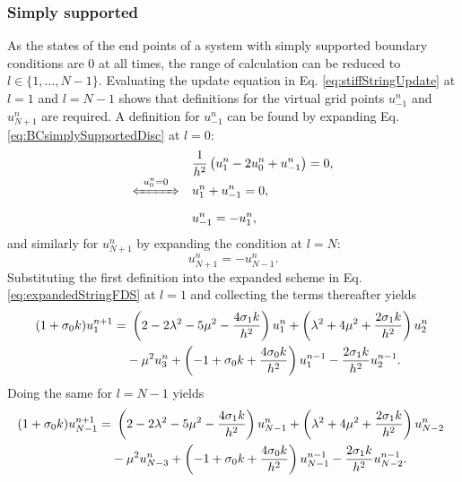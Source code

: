 \subsubsection{Simply supported}
As the states of the end points of a system with simply supported boundary conditions are $0$ at all times, the range of calculation can be reduced to $l\in \{ 1, \hdots, N-1\}$. Evaluating the update equation in Eq. \eqref{eq:stiffStringUpdate} at $l=1$ and $l=N-1$ shows that definitions for the virtual grid points $u_{-1}^n$ and $u_{N+1}^n$ are required. A definition for $u_{-1}^n$ can be found by expanding Eq. \eqref{eq:BCsimplySupportedDisc} at $l = 0$:
\begin{align}
    &\frac{1}{h^2}\left(u_1^n - 2 u_0^n + u_{-1}^n\right) = 0,\nonumber\\[-1em]
    \xLeftrightarrow{\mystrut\ u^n_0 = 0\ } \quad & u_1^n + u_{-1}^n = 0,\nonumber\\[0.25em]
    &u_{-1}^n = -u_1^n,\label{eq:simplySupportedResult}
\end{align}
and similarly for $u_{N+1}^n$ by expanding the condition at $l=N$:
\begin{equation*}
    u_{N+1}^n = -u_{N-1}^n.
\end{equation*}
Substituting the first definition into the expanded scheme in Eq. \eqref{eq:expandedStringFDS} at $l=1$ and collecting the terms thereafter yields
\begin{equation}
    \begin{aligned}
        \!\!\!(1+\sigma_{0} k) u_1^{n+1} =&\ \left(2 - 2\lambda^2 - 5\mu^2 - \frac{4\sigma_{1} k}{h^2}\right) u_1^n + \left(\lambda^2 + 4\mu^2 + \frac{2\sigma_{1} k}{h^2}\right) u_{2}^n \!\!\\
        &-\mu^2u_3^n+ \left(-1+\sigma_{0} k + \frac{4\sigma_{0} k}{h^2}\right)u_1^{n-1} - \frac{2\sigma_{1} k}{h^2}u_{2}^{n-1}.
    \end{aligned}
\end{equation}
Doing the same for $l=N-1$ yields
\begin{equation}
    \begin{aligned}
        \!\!(1+\sigma_{0} k) u_{N-1}^{n+1} =&\ \left(2 - 2\lambda^2 - 5\mu^2 - \frac{4\sigma_{1} k}{h^2}\right) u_{N-1}^n + \left(\lambda^2 + 4\mu^2 + \frac{2\sigma_{1} k}{h^2}\right) u_{N-2}^n \\
        &-\mu^2u_{N-3}^n+ \left(-1+\sigma_{0} k + \frac{4\sigma_{0} k}{h^2}\right)u_{N-1}^{n-1} - \frac{2\sigma_{1} k}{h^2}u_{N-2}^{n-1}.
    \end{aligned}
\end{equation}

